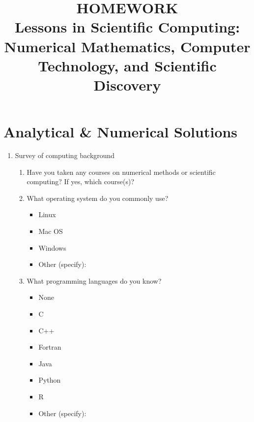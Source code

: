 \documentclass{article}
\begin{document}
\title{HOMEWORK\\
Lessons in Scientific Computing: \\
Numerical Mathematics, Computer Technology, and Scientific Discovery}
\date{}

\maketitle

\newpage
\section{Analytical \& Numerical Solutions}
\begin{enumerate}

\item  Survey of computing background
\begin{enumerate}
\item
Have you taken any courses on numerical methods or scientific computing? If yes, which course(s)?

\vspace{4em}


\item
What operating system do you commonly use?
\begin{itemize}
\renewcommand{\labelitemi}{$\square$} 
    \item Linux
    \item Mac OS
    \item Windows
    \item Other (specify):
\end{itemize}

\item
What programming languages do you know?
\begin{itemize}
\renewcommand{\labelitemi}{$\square$} 
    \item None
    \item C
    \item C++
    \item Fortran
    \item Java    
    \item Python
    \item R
    \item Other (specify): 
\end{itemize}


\end{enumerate}
\end{enumerate}
\end{document}
